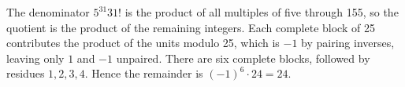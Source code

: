 The denominator $5^{31}31!$ is the product of all multiples of five through 155, so the quotient is the product of the remaining integers. Each complete block of 25 contributes the product of the units modulo 25, which is $-1$ by pairing inverses, leaving only $1$ and $-1$ unpaired. There are six complete blocks, followed by residues $1,2,3,4$. Hence the remainder is $(-1)^6\cdot24=\boxed{24}$.

